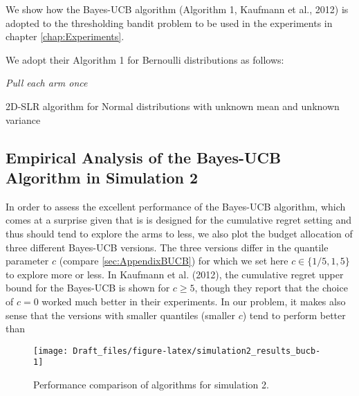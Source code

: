 \documentclass[11pt,]{article}
\begin{document}
We show how the Bayes-UCB algorithm (Algorithm 1, Kaufmann et al., 2012)
is adopted to the thresholding bandit problem to be used in the
experiments in chapter \autoref{chap:Experiments}.

We adopt their Algorithm 1 for Bernoulli distributions as follows:

\IncMargin{1em}

\begin{algorithm}
\BlankLine
\emph{Pull each arm once}\;
\caption{2D-SLR algorithm for Normal distributions with unknown mean and unknown variance}\label{algo_slr_2d}
\end{algorithm}

\DecMargin{1em}

\subsection{Empirical Analysis of the Bayes-UCB Algorithm in Simulation
2}\label{empirical-analysis-of-the-bayes-ucb-algorithm-in-simulation-2}

In order to assess the excellent performance of the Bayes-UCB algorithm,
which comes at a surprise given that is is designed for the cumulative
regret setting and thus should tend to explore the arms to less, we also
plot the budget allocation of three different Bayes-UCB versions. The
three versions differ in the quantile parameter \(c\) (compare
\autoref{sec:AppendixBUCB}) for which we set here
\(c \in \{1/5, 1, 5\}\) to explore more or less. In Kaufmann et al.
(2012), the cumulative regret upper bound for the Bayes-UCB is shown for
\(c\geq 5\), though they report that the choice of \(c=0\) worked much
better in their experiments. In our problem, it makes also sense that
the versions with smaller quantiles (smaller \(c\)) tend to perform
better than

\begin{figure}

{\centering \texttt{[image: Draft\_files/figure-latex/simulation2\_results\_bucb-1]} 

}

\caption{Performance comparison of algorithms for simulation 2.}\label{fig:simulation2_results_bucb}
\end{figure}
\end{document}
